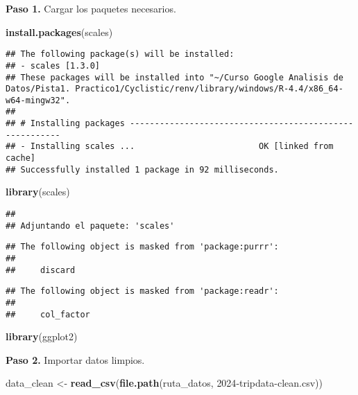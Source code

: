 \documentclass[
]{article}
\newenvironment{Shaded}{\begin{snugshade}}{\end{snugshade}}
\newcommand{\FunctionTok}[1]{\textcolor[rgb]{0.13,0.29,0.53}{\textbf{#1}}}
\newcommand{\NormalTok}[1]{#1}
\newcommand{\OtherTok}[1]{\textcolor[rgb]{0.56,0.35,0.01}{#1}}
\newcommand{\StringTok}[1]{\textcolor[rgb]{0.31,0.60,0.02}{#1}}
\begin{document}
\hfill\break
\textbf{Paso 1.} Cargar los paquetes necesarios.

\begin{Shaded}
\begin{Highlighting}[]
\FunctionTok{install.packages}\NormalTok{(}\StringTok{\textquotesingle{}scales\textquotesingle{}}\NormalTok{)}
\end{Highlighting}
\end{Shaded}

\begin{verbatim}
## The following package(s) will be installed:
## - scales [1.3.0]
## These packages will be installed into "~/Curso Google Analisis de Datos/Pista1. Practico1/Cyclistic/renv/library/windows/R-4.4/x86_64-w64-mingw32".
## 
## # Installing packages --------------------------------------------------------
## - Installing scales ...                         OK [linked from cache]
## Successfully installed 1 package in 92 milliseconds.
\end{verbatim}

\begin{Shaded}
\begin{Highlighting}[]
\FunctionTok{library}\NormalTok{(scales)}
\end{Highlighting}
\end{Shaded}

\begin{verbatim}
## 
## Adjuntando el paquete: 'scales'
\end{verbatim}

\begin{verbatim}
## The following object is masked from 'package:purrr':
## 
##     discard
\end{verbatim}

\begin{verbatim}
## The following object is masked from 'package:readr':
## 
##     col_factor
\end{verbatim}

\begin{Shaded}
\begin{Highlighting}[]
\FunctionTok{library}\NormalTok{(ggplot2)}
\end{Highlighting}
\end{Shaded}

\hfill\break
\textbf{Paso 2.} Importar datos limpios.

\begin{Shaded}
\begin{Highlighting}[]
\NormalTok{data\_clean }\OtherTok{\textless{}{-}} \FunctionTok{read\_csv}\NormalTok{(}\FunctionTok{file.path}\NormalTok{(ruta\_datos, }\StringTok{\textquotesingle{}2024{-}tripdata{-}clean.csv\textquotesingle{}}\NormalTok{))}
\end{Highlighting}
\end{Shaded}
\end{document}
